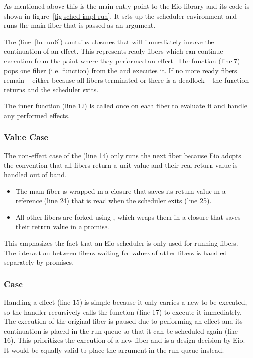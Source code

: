 As mentioned above this is the main entry point to the Eio library and its code is shown in figure~\ref{fig:sched-impl-run}.
It sets up the scheduler environment and runs the main fiber that is passed as an argument.

The  (line~\ref{ln:run6}) contains closures that will immediately invoke the continuation of an effect.
This represents ready fibers which can continue execution from the point where they performed an effect.
The  function (line 7) pops one fiber (i.e. function) from the  and executes it.
If no more ready fibers remain -- either because all fibers terminated or there is a deadlock -- the  function returns and the scheduler exits.

The inner  function (line 12) is called once on each fiber to evaluate it and handle any performed effects.
\subsubsection*{Value Case}
The non-effect case of the  (line 14) only runs the next fiber because Eio adopts the convention that all fibers return a unit value and their real return value is handled out of band.
\begin{itemize}
  \item The main fiber is wrapped in a closure that saves its return value in a reference (line 24) that is read when the scheduler exits (line 25).
  \item All other fibers are forked using , which wraps them in a closure that saves their return value in a promise.
\end{itemize}

This emphasizes the fact that an Eio scheduler is only used for running fibers.
The interaction between fibers waiting for values of other fibers is handled separately by promises.

\subsubsection*{\efork{} Case}
Handling a \efork{} effect (line 15) is simple because it only carries a new  to be executed, so the handler recursively calls the  function (line 17) to execute it immediately.
The execution of the original fiber is paused due to performing an effect and its continuation  is placed in the run queue so that it can be scheduled again (line 16).
This prioritizes the execution of a new fiber and is a design decision by Eio.
It would be equally valid to place the  argument in the run queue instead.

